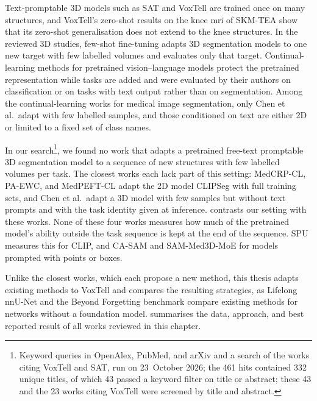 Text-promptable 3D models such as SAT and VoxTell are trained once on many structures, and VoxTell's zero-shot results on the knee \gls{mri} of SKM-TEA show that its zero-shot generalisation does not extend to the knee structures.
In the reviewed 3D studies, few-shot fine-tuning adapts 3D segmentation models to one new target with few labelled volumes and evaluates only that target.
Continual-learning methods for pretrained vision--language models protect the pretrained representation while tasks are added and were evaluated by their authors on classification or on tasks with text output rather than on segmentation.
Among the continual-learning works for medical image segmentation, only Chen et al.\ adapt with few labelled samples, and those conditioned on text are either 2D or limited to a fixed set of class names.

In our search\footnote{Keyword queries in OpenAlex, PubMed, and arXiv and a search of the works citing VoxTell and SAT, run on 23~October 2026; the 461 hits contained 332 unique titles, of which 43 passed a keyword filter on title or abstract; these 43 and the 23 works citing VoxTell were screened by title and abstract.}, we found no work that adapts a pretrained free-text promptable 3D segmentation model to a sequence of new structures with few labelled volumes per task.
The closest works each lack part of this setting: MedCRP-CL, PA-EWC, and MedPEFT-CL adapt the 2D model CLIPSeg with full training sets, and Chen et al.\ adapt a 3D model with few samples but without text prompts and with the task identity given at inference.
 contrasts our setting with these works.
None of these four works measures how much of the pretrained model's ability outside the task sequence is kept at the end of the sequence.
SPU measures this for CLIP, and CA-SAM and SAM-Med3D-MoE for models prompted with points or boxes.



Unlike the closest works, which each propose a new method, this thesis adapts existing methods to VoxTell and compares the resulting strategies, as Lifelong nnU-Net and the Beyond Forgetting benchmark compare existing methods for networks without a foundation model.
 summarises the data, approach, and best reported result of all works reviewed in this chapter.

\clearpage

